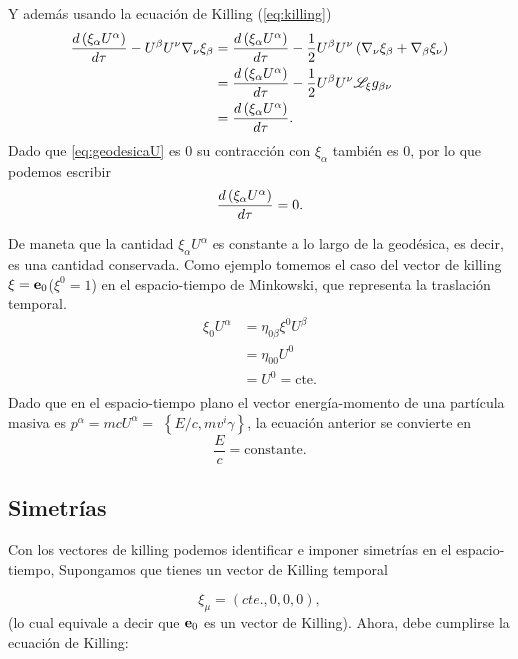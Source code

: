 Y además usando la ecuación de Killing (\ref{eq:killing}) 
\begin{equation}
\begin{aligned}
    \frac{d \left(\xi_\alpha U^\alpha\right)}{d  \tau} - U^\beta U^\nu \mathbf{\nabla}_\nu \xi_\beta & = \frac{d \left(\xi_\alpha U^\alpha\right)}{d  \tau} - \frac{1}{2}U^\beta U^\nu  \left( \mathbf{\nabla}_\nu \xi_\beta + \mathbf{\nabla}_\beta \xi_\nu \right)\\
    & = \frac{d \left(\xi_\alpha U^\alpha\right)}{d  \tau} - \frac{1}{2}U^\beta U^\nu \mathscr{L}_\xi g_{\beta \nu} \\
    & = \frac{d \left(\xi_\alpha U^\alpha\right)}{d  \tau}.
\end{aligned}    
\end{equation}
Dado que \ref{eq:geodesicaU} es $0$ su contracción con $\xi_\alpha$ también es $0$, por lo que podemos escribir
\begin{equation}
    \frac{d \left(\xi_\alpha U^\alpha\right)}{d  \tau} = 0.
\end{equation}

De maneta que la cantidad $\xi_\alpha U^\alpha$ es constante a lo largo de la geodésica, es decir, es una cantidad conservada.
Como ejemplo tomemos el caso del vector de killing $\mathbf{\xi} = \mathbf{e}_0$($\xi^0 =1$) en el espacio-tiempo de Minkowski, que representa la traslación temporal. 
\begin{equation}
    \begin{aligned}
        \xi_0 U^\alpha & = \eta_{0 \beta} \xi^0 U^\beta \\
        & = \eta_{0 0 } U^0 \\
        & = U^0 = \text{cte.} \\
    \end{aligned}
\end{equation} 
Dado que en el espacio-tiempo plano el vector energía-momento de una partícula masiva es $p^\alpha=m c U^\alpha=$ $\left\{E / c, m v^i \gamma\right\}$, la ecuación anterior se convierte en
\[
    \frac{E}{c}=\text{constante}.
\]


\subsection{Simetrías }
\label{subsec:simetria}
Con los  vectores de killing podemos identificar e imponer simetrías en el espacio-tiempo,
Supongamos que tienes un vector de Killing temporal

\begin{equation}
    \xi_\mu=(cte.,0,0,0),   
\end{equation}
(lo cual equivale a decir que $\mathbf{e}_0$ es un vector de Killing).
Ahora, debe cumplirse la ecuación de Killing:

